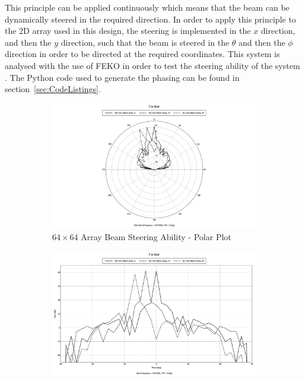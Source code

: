 \documentclass[11pt]{witseiepaper}
\begin{document}
\begin{bibunit}[witseie]
This principle can be applied continuously which means that the beam can be dynamically steered in the required direction.
In order to apply this principle to the 2D array used in this design, the steering is implemented in the $x$ direction, and then the $y$ direction, such that the beam is steered in the $\theta$ and then the $\phi$ direction in order to be directed at the required coordinates.
This system is analysed with the use of FEKO in order to test the steering ability of the system \cite{FEKO}. The Python code used to generate the phasing can be found in section~\ref{sec:CodeListings}.
\begin{figure}[htb]
    \centering
    \begin{subfigure}{.5\textwidth}
        \centering
            \includegraphics[width=0.9\linewidth]{SteeringBig-Polar.pdf}
            \caption{$64 \times 64$ Array Beam Steering Ability - Polar Plot}
            \label{fig:SteeringBig-Polar}
        \end{subfigure}%
        \begin{subfigure}{.5\textwidth}
            \centering
            \includegraphics[width=0.9\linewidth]{SteeringBig-Cartesian.pdf}

\end{subfigure}
\end{figure}
\end{bibunit}
\end{document}
